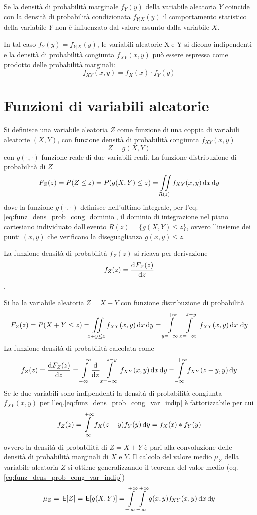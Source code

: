 Se la densità di probabilità marginale $f_Y(y)$ della variabile aleatoria $Y$ coincide con la densità di probabilità condizionata $f_{Y|X}(y)$ il comportamento statistico della variabile $Y$ non è influenzato dal valore assunto dalla variabile $X$.

In tal caso $f_Y(y)=f_{Y|X}(y)$, le variabili aleatorie X e Y si dicono indipendenti e la densità di probabilità congiunta $f_{XY}(x,y)$ può essere espressa come prodotto delle probabilità marginali:
\begin{equation}\label{eq:funz_dens_prob_cong_var_indip}
f_{XY}(x,y)=f_X(x)\cdot f_Y(y)
\end{equation}

\clearpage
\section{Funzioni di variabili aleatorie}
Si definisce una variabile aleatoria $Z$ come funzione di una coppia di variabili aleatorie $(X,Y)$, con funzione densità di probabilità congiunta $f_{XY}(x,y)$
\[Z=g(X,Y)\]
con $g(\cdot,\cdot)$ funzione reale di due variabili reali. La funzione distribuzione di probabilità di $Z$
\[F_Z(z)=P(Z\leq z)=P(g(X,Y)\leq z)=\iint\limits_{R(z)}{f_{XY}(x,y)\mathop{}\!\mathrm{d} x \mathop{}\!\mathrm{d} y}\]
dove la funzione $g(\cdot,\cdot)$ definisce nell'ultimo integrale, per l'eq.\ref{eq:funz_dens_prob_cong_dominio}, il dominio di integrazione nel piano cartesiano individuato dall'evento $R(z)=\{g(X,Y)\leq z\}$, ovvero l'insieme dei punti $(x,y)$ che verificano la diseguaglianza $g(x,y)\leq z$.

La funzione densità di probabilità $f_Z(z)$ si ricava per derivazione
\[f_Z(z)=\dfrac{\mathop{}\!\mathrm{d}^{}F_Z(z)}{\mathop{}\!\mathrm{d} z^{}}\].

\begin{esempio}
Si ha la variabile aleatoria $Z=X+Y$ con funzione distribuzione di probabilità
\[F_Z(z)=P(X+Y\leq z)=\iint\limits_{x+y\leq z}{f_{XY}(x,y)\mathop{}\!\mathrm{d} x \mathop{}\!\mathrm{d} y}=\int\limits_{y=-\infty}^{+\infty}\int\limits_{x=-\infty}^{z-y}{f_{XY}(x,y)}{\,\mathop{}\!\mathrm{d} x\,\mathop{}\!\mathrm{d} y}\]
La funzione densità di probabilità calcolata come \[f_Z(z)=\dfrac{\mathop{}\!\mathrm{d}^{}F_Z(z)}{\mathop{}\!\mathrm{d} z^{}}=\int\limits_{-\infty}^{+\infty}{\dfrac{\mathop{}\!\mathrm{d}^{}}{\mathop{}\!\mathrm{d} z^{}}\int\limits_{x=-\infty}^{z-y}{f_{XY}(x,y)}{\,\mathop{}\!\mathrm{d}{x}}}{\,\mathop{}\!\mathrm{d}{y}}=\int\limits_{-\infty}^{+\infty}{f_{XY}(z-y,y)}{\,\mathop{}\!\mathrm{d}{y}}\]
Se le due variabili sono indipendenti la densità di probabilità congiunta $f_{XY}(x,y)$ per l'eq.\ref{eq:funz_dens_prob_cong_var_indip} è fattorizzabile per cui
\[f_Z(z)=\int\limits_{-\infty}^{+\infty}{f_X(z-y)f_Y(y)}{\,\mathop{}\!\mathrm{d}{y}}=f_X(x)\ast f_Y(y)\]
ovvero la densità di probabilità di $Z=X+Y$ è pari alla convoluzione delle densità di probabilità marginali di $X$ e $Y$.
Il calcolo del valore medio $\mu_Z$ della variabile aleatoria $Z$ si ottiene generalizzando il teorema del valor medio (eq.\ref{eq:funz_dens_prob_cong_var_indip})
\[\mu_Z=\,{\operatorname{\mathsf{E}}}\!\left[{Z}\right]=\,{\operatorname{\mathsf{E}}}\!\left[{g(X,Y)}\right]=\int\limits_{-\infty}^{+\infty}{\int\limits_{-\infty}^{+\infty}{g(x,y)f_{XY}(x,y)}{\,\mathop{}\!\mathrm{d}{x}}}{\,\mathop{}\!\mathrm{d}{y}}\]
\end{esempio}


